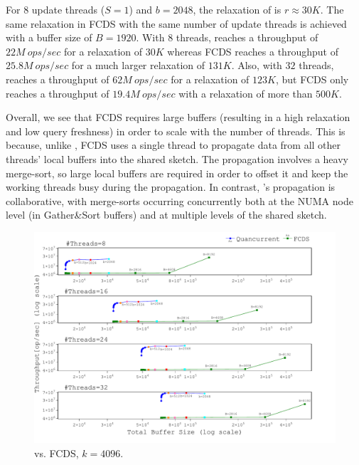 For $8$ update threads ($S=1$) and $b=2048$, the relaxation of \mysketch is $r\approx 30K$. The same relaxation in FCDS with the same number of update threads is achieved with a buffer size of $B=1920$.
With $8$ threads, \mysketch reaches a throughput of $22M\ ops/sec$ for a relaxation of $30K$ whereas FCDS reaches a throughput of $25.8M\ ops/sec$ for a much larger relaxation of $131K$. Also, with $32$ threads, \mysketch reaches a throughput of $62M\ ops/sec$ for a relaxation of $123K$, but FCDS only reaches a throughput of $19.4M\ ops/sec$ with a relaxation of more than $500K$.  

Overall, we see that FCDS requires large buffers (resulting in a high relaxation and low query freshness) in order to scale with the number of threads. This is because, unlike \mysketch, FCDS uses a single thread to propagate data from all other threads' local buffers into the shared sketch. The propagation involves a heavy merge-sort, so large local buffers are required in order to offset it and keep the working threads busy during the propagation. In contrast, \mysketch's propagation is collaborative, with merge-sorts occurring concurrently both at the NUMA node level (in Gather\&Sort buffers) and at multiple levels of the shared sketch.


\begin{figure}[h]
\includegraphics[width=\textwidth,trim={0cm 0cm 0cm 0cm},clip]
{graphics/graphs/FCDS/oracle_QvsFCDS_block_numa_update_k4096_keys10M_T8_16_24_32_runs15_eq_relax_logscale_largeB_RmLast2_colorPoints_25-12-2022_08-36-36.pdf}
\caption{\mysketch vs. FCDS, $k=4096$.}
\label{fig:compare_FCDS_k4096}
\end{figure}

